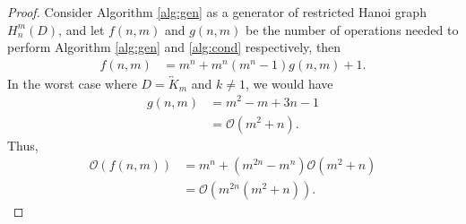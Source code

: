 \documentclass[10pt,a4paper]{amsart}
\begin{document}
\begin{proof}
    Consider Algorithm \ref{alg:gen} as a generator of  restricted Hanoi graph $H_{n}^{m}(D)$, and let $f(n,m)$ and $g(n,m)$ be the number of operations needed to perform Algorithm \ref{alg:gen} and \ref{alg:cond} respectively, then
    \begin{align*}
        f(n,m)&=m^{n}+m^{n}(m^{n}-1)g(n,m)+1.
    \end{align*}
   In the worst case where $D=\overleftrightarrow{K}_{m}$ and $k\neq 1$, we would have
    \begin{align*}
        g(n,m)&=m^{2}-m+3n-1\\
        &=\mathcal{O}(m^{2}+n).
    \end{align*}
    Thus, 
    \begin{align*}
        \mathcal{O}(f(n,m))&=m^{n}+(m^{2n}-m^{n})\mathcal{O}(m^{2}+n)\\
        &=\mathcal{O}(m^{2n}(m^{2}+n)).
    \end{align*}
    
\end{proof}
\end{document}
